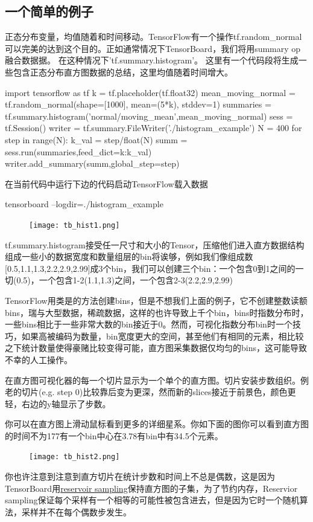 \subsection{一个简单的例子}
正态分布变量，均值随着和时间移动。TensorFlow有一个操作tf.random\_normal可以完美的达到这个目的。正如通常情况下TensorBoard，我们将用summary op融合数据据。
在这种情况下'tf.summary.histogram'。
这里有一个代码段将生成一些包含正态分布直方图数据的总结，这里均值随着时间增大。
\begin{python}
import tensorflow as tf
k = tf.placeholder(tf.float32)
mean_moving_normal = tf.random_normal(shape=[1000], mean=(5*k), stddev=1)
summaries = tf.summary.histogram('normal/moving_mean',mean_moving_normal)
sess = tf.Session()
writer = tf.summary.FileWriter('./histogram_example')
N = 400
for step in range(N):
    k_val = step/float(N)
    summ = sess.run(summaries,feed_dict={k:k_val})
    writer.add_summary(summ,global_step=step)
\end{python}
在当前代码中运行下边的代码启动TensorFlow载入数据
\begin{python}
tensorboard --logdir=./histogram_example
\end{python}
\begin{center}
\begin{figure}[H]
\texttt{[image: tb\_hist1.png]}
\end{figure}
\end{center}
tf.summary.histogram接受任一尺寸和大小的Tensor，压缩他们进入直方数据结构组成一些小的数据宽度和数量组层的bin将诶够，例如我们像组成数[0.5,1.1,1.3,2.2,2.9,2.99]成3个bin，我们可以创建三个bin：一个包含0到1之间的一切(0.5)，一个包含1-2(1.1,1.3)之间，一个包含2-3(2.2,2.9,2.99)

  TensorFlow用类是的方法创建bins，但是不想我们上面的例子，它不创建整数读额bins，瑞与大型数据，稀疏数据，这样的也许导致上千个bin，bins时指数分布时，一些bins相比于一些非常大数的bin接近于0。然而，可视化指数分布bin时一个技巧，如果高被编码为数量，bin宽度更大的空间，甚至他们有相同的元素，相比较之下统计数量使得豪赌比较变得可能，直方图采集数据仅均匀的bins，这可能导致不幸的人工操作。

在直方图可视化器的每一个切片显示为一个单个的直方图。切片安装步数组织。例老的切片(e.g. step 0)比较靠后变为更深，然而新的slices接近于前景色，颜色更轻，右边的y轴显示了步数。

你可以在直方图上滑动鼠标看到更多的详细星系。你如下面的图你可以看到直方图的时间不为177有一个bin中心在3.78有bin中有34.5个元素。
\begin{center}
\begin{figure}[H]
\texttt{[image: tb\_hist2.png]}
\end{figure}
\end{center}
你也许注意到注意到直方切片在统计步数和时间上不总是偶数，这是因为TensorBoard用\href{https://en.wikipedia.org/wiki/Reservoir\_sampling}{reservoir sampling}保持直方图的子集，为了节约内存，Reservior sampling保证每个采样有一个相等的可能性被包含进去，但是因为它时一个随机算法，采样并不在每个偶数步发生。
